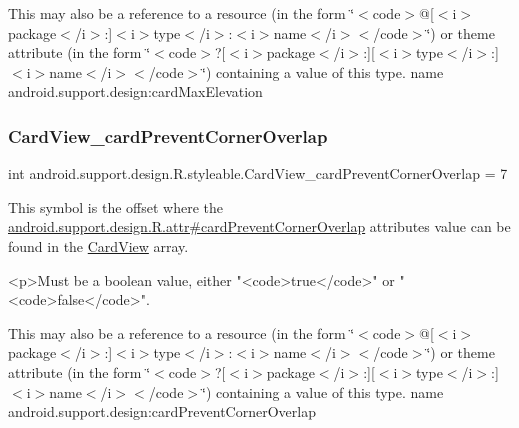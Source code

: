 This may also be a reference to a resource (in the form \char`\"{}$<$code$>$@\mbox{[}$<$i$>$package$<$/i$>$\+:\mbox{]}$<$i$>$type$<$/i$>$\+:$<$i$>$name$<$/i$>$$<$/code$>$\char`\"{}) or theme attribute (in the form \char`\"{}$<$code$>$?\mbox{[}$<$i$>$package$<$/i$>$\+:\mbox{]}\mbox{[}$<$i$>$type$<$/i$>$\+:\mbox{]}$<$i$>$name$<$/i$>$$<$/code$>$\char`\"{}) containing a value of this type.  name android.\+support.\+design\+:card\+Max\+Elevation \mbox{\label{classandroid_1_1support_1_1design_1_1R_1_1styleable_af6467363197508f4dffe4ce79959a4e7}} 
\subsubsection{\texorpdfstring{Card\+View\+\_\+card\+Prevent\+Corner\+Overlap}{CardView\_cardPreventCornerOverlap}}
{\footnotesize\ttfamily int android.\+support.\+design.\+R.\+styleable.\+Card\+View\+\_\+card\+Prevent\+Corner\+Overlap = 7\hspace{0.3cm}{\ttfamily [static]}}

This symbol is the offset where the \hyperlink{classandroid_1_1support_1_1design_1_1R_1_1attr_a550a939ee685a91fd5d5842fefc73113}{android.\+support.\+design.\+R.\+attr\#card\+Prevent\+Corner\+Overlap} attribute\textquotesingle{}s value can be found in the \hyperlink{classandroid_1_1support_1_1design_1_1R_1_1styleable_a56025691fb136d28dc5fce5a25d7c65e}{Card\+View} array.

\begin{DoxyVerb}      <p>Must be a boolean value, either "<code>true</code>" or "<code>false</code>".
\end{DoxyVerb}
 

This may also be a reference to a resource (in the form \char`\"{}$<$code$>$@\mbox{[}$<$i$>$package$<$/i$>$\+:\mbox{]}$<$i$>$type$<$/i$>$\+:$<$i$>$name$<$/i$>$$<$/code$>$\char`\"{}) or theme attribute (in the form \char`\"{}$<$code$>$?\mbox{[}$<$i$>$package$<$/i$>$\+:\mbox{]}\mbox{[}$<$i$>$type$<$/i$>$\+:\mbox{]}$<$i$>$name$<$/i$>$$<$/code$>$\char`\"{}) containing a value of this type.  name android.\+support.\+design\+:card\+Prevent\+Corner\+Overlap \mbox{\label{classandroid_1_1support_1_1design_1_1R_1_1styleable_a6d33db49497d7e18a8bf8487f8d988b5}} 
